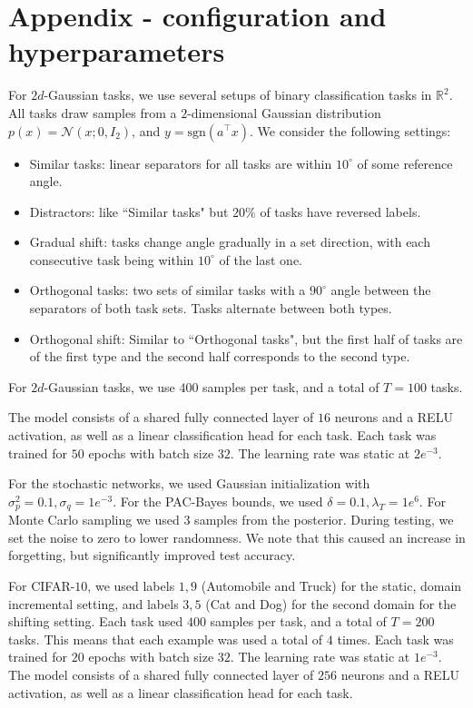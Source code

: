 \documentclass{article}
\theoremstyle{plain}
\theoremstyle{definition}
\theoremstyle{remark}
\begin{document}
\section{Appendix - configuration and hyperparameters} \label{append:hyperparam}

For $2d$-Gaussian tasks, we use several setups of binary classification tasks in $\mathbb{R}^2$. All tasks draw samples from a $2$-dimensional Gaussian distribution $p(x) = \mathcal{N}(x;0,I_2)$, and $y=\mathrm{sgn}(a^\top x)$. We consider the following settings:
\begin{itemize}
    \item Similar tasks: linear separators for all tasks are within $10^\circ$ of some reference angle.
    \item Distractors: like ``Similar tasks" but $20\%$  of tasks have reversed labels.
    \item Gradual shift: tasks change angle gradually in a set direction, with each consecutive task being within $10^\circ$ of the last one.
    \item Orthogonal tasks: two sets of similar tasks with a $90^\circ$ angle between the separators of both task sets. Tasks alternate between both types.
    \item Orthogonal shift: Similar to ``Orthogonal tasks", but the first half of tasks are of the first type and the second half corresponds to the second type.
\end{itemize}

For $2d$-Gaussian tasks, we use $400$ samples per task, and a total of $T=100$ tasks.

The model consists of a shared fully connected layer of $16$ neurons and a RELU activation, as well as a linear classification head for each task. Each task was trained for $50$ epochs with batch size $32$. The learning rate was static at $2e^{-3}$.

For the stochastic networks, we used Gaussian initialization with $\sigma_p^2=0.1, \sigma_q=1e^{-3}$. For the PAC-Bayes bounds, we used $\delta=0.1, \lambda_T=1e^6$. For Monte Carlo sampling we used $3$ samples from the posterior. During testing, we set the noise to zero to lower randomness. We note that this caused an increase in forgetting, but significantly improved test accuracy.

For CIFAR-$10$, we used labels $1, 9$ (Automobile and Truck) for the static, domain incremental setting, and labels $3, 5$ (Cat and Dog) for the second domain for the shifting setting. 
Each task used $400$ samples per task, and a total of $T=200$ tasks. This means that each example was used a total of $4$ times. Each task was trained for $20$ epochs with batch size $32$. The learning rate was static at $1e^{-3}$.
The model consists of a shared fully connected layer of $256$ neurons and a RELU activation, as well as a linear classification head for each task. 
\end{document}
